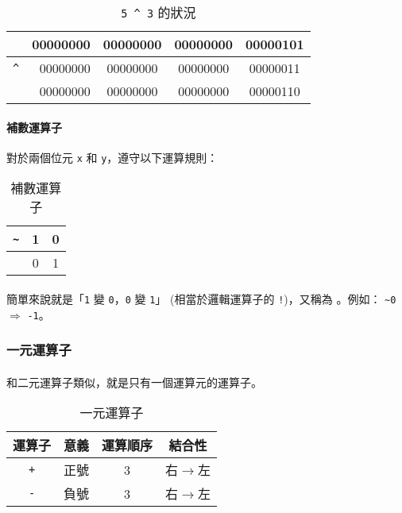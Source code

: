 \documentclass[12pt,a4paper,oneside]{article}
\begin{document}
\begin{CJK}{UTF8}{bkai}
\begin{table}[h!]
\centering
\begin{tabular}{|c|r|c|c|c|}
\hline
 & 00000000 & 00000000 & 00000000 & 00000{\color{red}101}\\
\hline
\lstinline!^! & 00000000 & 00000000 & 00000000 & 00000{\color{red}011}\\
\hline\hline
 & 00000000 & 00000000 & 00000000 & 00000{\color{red}110}\\
\hline
\end{tabular}
\caption{\lstinline!5 ^ 3! 的狀況}
\label{basic:cpp:table:5:xor:3}
\end{table}

\paragraph{補數運算子}對於兩個位元 \lstinline!x! 和 \lstinline!y!，遵守以下運算規則：

\begin{table}[h!]
\centering
\begin{tabular}{|c||c|c|}
\hline
\lstinline!~! & \textbf{1} & \textbf{0}\\
\hline
 & 0         & 1\\
\hline
\end{tabular}
\caption{補數運算子}
\label{basic:cpp:table:operator:complement}
\end{table}

\paragraph{}簡單來說就是「\lstinline!1! 變 \lstinline!0!，\lstinline!0! 變 \lstinline!1!」 (相當於邏輯運算子的 \lstinline"!")，又稱為 。例如： \lstinline!~0! $\Rightarrow$ \lstinline!-1!。

\subsubsection{一元運算子}

\paragraph{}和二元運算子類似，就是只有一個運算元的運算子。
\begin{table}[h!]
\centering
\begin{tabular}{|c|c|c|c|}
\hline
運算子 & 意義 & 運算順序 & 結合性\\
\hline
\lstinline!+! & 正號 & 3 & 右$\rightarrow$左\\
\hline
\lstinline!-! & 負號 & 3 & 右$\rightarrow$左\\
\hline
\end{tabular}
\caption{一元運算子}
\label{basic:cpp:table:operator:uniary}
\end{table}


\end{CJK}
\end{document}
